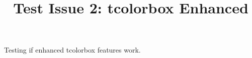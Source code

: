 \documentclass{article}
\begin{document}
\title{Test Issue 2: tcolorbox Enhanced}
\maketitle

\begin{testbox}
Testing if enhanced tcolorbox features work.
\end{testbox}
\end{document}
